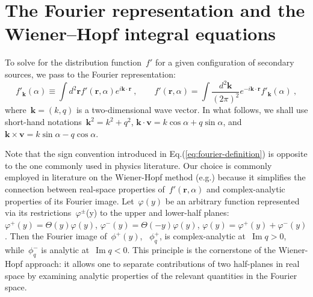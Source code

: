 \documentclass[preprint,aps,eqsecnum]{revtex4-1}
\newcommand{\fplus}[1]{{#1}^{+}}
\newcommand{\fminus}[1]{{#1}^{-}}
\newcommand{\fplusminus}[1]{{#1}^{\pm}}
\renewcommand{\Im}{\mathop{\mathrm{Im}}\nolimits}
\begin{document}
\section{The Fourier representation and the Wiener--Hopf integral equations}
\label{sec:fourier-wh}
To solve for the distribution function~$f'$ for a given configuration
of secondary sources,  we pass to the Fourier representation:
\begin{equation}
  \label{eq:fourier-definition}
  f'_{\bm k}(\alpha) \equiv \int d^2{\bm r} f'({\bm r}, \alpha)
  e^{i {\bm k} \cdot{\bm r}}
  \ ,
  \qquad
  f'({\bm r}, \alpha) =
  \int \frac{d^2 {\bm k}}{(2\pi)^2} e^{-i {\bm k}\cdot{\bm r}} f'_{\bm k}(\alpha)
  \ ,
\end{equation}
where~${\bm k} = (k, q)$ is a two-dimensional wave vector. In what follows,
we shall use short-hand notations~${\bm k}^2 = k^2 + q^2$,
${\bm k}\cdot{\bm v} = k \cos \alpha + q \sin\alpha$,
and~${\bm k}\times{\bm v} = k \sin\alpha - q \cos\alpha$.

Note that the sign convention introduced in Eq.(\ref{eq:fourier-definition})
is opposite to the one commonly used in physics literature. Our choice is
commonly employed in literature on the Wiener-Hopf
method (e.g.\cite{bib:wiener-hopf})
because it simplifies the connection between real-space
properties of~$f'({\bm r}, \alpha)$
and complex-analytic properties of its Fourier image.
Let~$\varphi(y)$ be an arbitrary function represented
via its restrictions~$\fplusminus{\varphi}$(y)
to the upper and lower-half planes: $\fplus{\varphi}(y) = \Theta(y)\varphi(y)$,
$\fminus{\varphi}(y) = \Theta(-y) \varphi(y)$,
$\varphi(y) = \fplus{\varphi}(y) + \fminus{\varphi}(y)$.
Then the Fourier image of~$\fplus{\phi}(y)$, ~$\fplus{\phi}_{q}$,
is complex-analytic at~$\Im q > 0$, while~$\fminus{\phi}_{q}$
is analytic at~$\Im q < 0$. This principle is the cornerstone of
the Wiener-Hopf approach: it allows one to separate contributions
of two half-planes in real space by examining analytic properties
of the relevant quantities in the Fourier space. 
\end{document}
